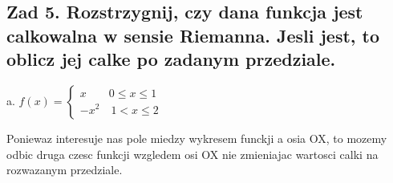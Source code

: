 \documentclass{article}
\begin{document}
\subsection*{Zad 5. Rozstrzygnij, czy dana funkcja jest calkowalna w sensie Riemanna. Jesli jest, to oblicz jej calke po zadanym przedziale.}
{\color{emp}a. $f(x)=\begin{cases}x\quad\quad0\leq x\leq1\\-x^2\quad 1<x\leq2\end{cases}$}
\begin{center}\end{center}
    Poniewaz interesuje nas pole miedzy wykresem funckji a osia OX, to mozemy odbic druga czesc funkcji wzgledem osi OX nie zmieniajac wartosci calki na rozwazanym przedziale.
    \begin{center}
    \end{center}
\end{document}
